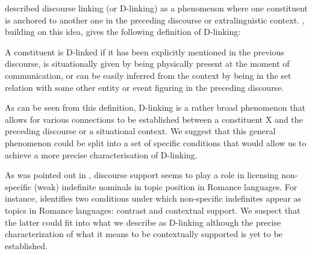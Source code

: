 \documentclass[output=paper]{langsci/langscibook}
\begin{document}
\cite{pesetsky:87} described discourse linking (or D-linking) as a phenomenon where one constituent is anchored to another one in the preceding discourse or extralinguistic context. \cite[][73]{dyakonova:09}, building on this idea, gives the following definition of D-linking:

\begin{exe}
\ex\label{2ex:20}
{
A constituent is D-linked if it has been explicitly mentioned in the previous discourse, is situationally given by being physically present at the moment of communication, or can be easily inferred from the context by being in the set relation with some other entity or event figuring in the preceding discourse.
}
\end{exe}

{
As can be seen from this definition, D-linking is a rather broad phenomenon that allows for various connections to be established between a constituent X and the preceding discourse or a situational context. We suggest that this general phenomenon could be split into a set of specific conditions that would allow us to achieve a more precise characterisation of D-linking.
}

As was pointed out in , discourse support seems to play a role in licensing non-specific (weak) indefinite nominals in topic position in Romance languages. For instance, \cite{leonetti:10} identifies two conditions under which non-specific indefinites appear as topics in Romance languages: contrast and contextual support. We suspect that the latter could fit into what we describe as D-linking although the precise characterization of what it means to be contextually supported is yet to be established.
\end{document}
